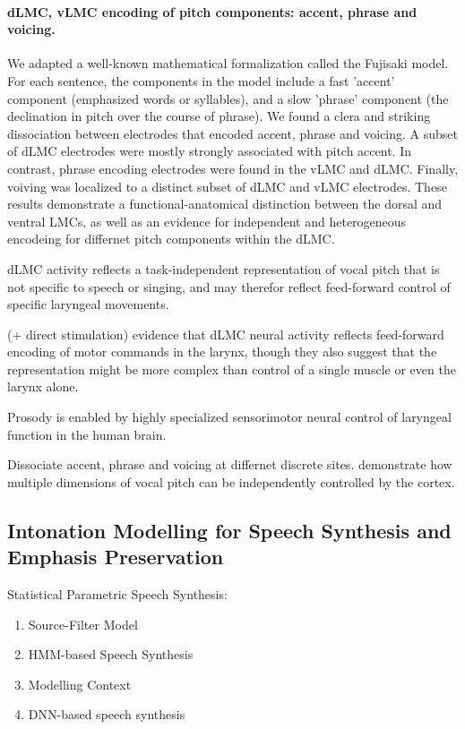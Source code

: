 \documentclass[12pt]{article}
\begin{document}
\paragraph{dLMC, vLMC encoding of pitch components: accent, phrase and voicing.} We adapted a well-known mathematical formalization called the Fujisaki model. For each sentence, the components in the model include a fast 'accent' component (emphasized words or syllables), and a slow 'phrase' component (the declination in pitch over the course of phrase).
We found a clera and striking dissociation between electrodes that encoded accent, phrase and voicing. A subset of dLMC electrodes were mostly strongly associated with pitch accent. In contrast, phrase encoding electrodes were found in the vLMC and dLMC. Finally, voiving was localized to a distinct subset of dLMC and vLMC electrodes. These results demonstrate a functional-anatomical distinction between the dorsal and ventral LMCs, as well as an evidence for independent and heterogeneous encodeing for differnet pitch components within the dLMC.

dLMC activity reflects a task-independent representation of vocal pitch that is not specific to speech or singing, and may therefor reflect feed-forward control of specific laryngeal movements.

(+ direct stimulation) evidence that dLMC neural activity reflects feed-forward encoding of motor commands in the larynx, though they also suggest that the representation might be more complex than control of a single muscle or even the larynx alone.

Prosody is enabled by highly specialized sensorimotor neural control of laryngeal function in the human brain.

Dissociate accent, phrase and voicing at differnet discrete sites. demonstrate how multiple dimensions of vocal pitch can be independently controlled by the cortex. 

\subsection{Intonation Modelling for Speech Synthesis and Emphasis Preservation \cite{honnet2017intonation}}


Statistical Parametric Speech Synthesis: \begin{enumerate}
\item Source-Filter Model
\item HMM-based Speech Synthesis
\item Modelling Context
\item DNN-based speech synthesis
\end{enumerate}
\end{document}
